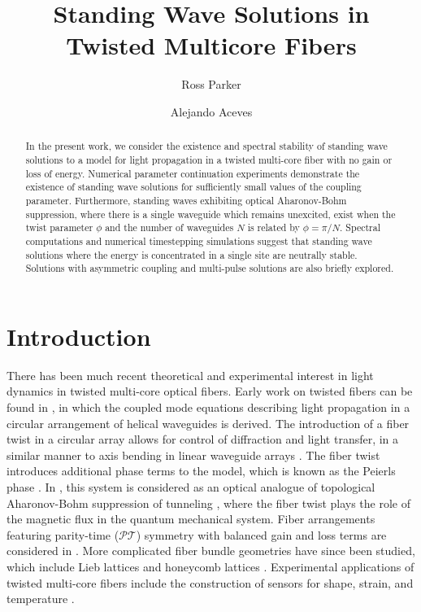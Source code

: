 \documentclass[reprint, amsmath,amssymb,aps,pra]{revtex4-2}
\begin{document}
\title{Standing Wave Solutions in Twisted Multicore Fibers}

\author{Ross Parker}
\address{Department of Mathematics, Southern Methodist Univeristy, 
Dallas, TX 75275}

\author{Alejando Aceves}
\address{Department of Mathematics, Southern Methodist Univeristy, 
Dallas, TX 75275}

\begin{abstract}
In the present work, we consider the existence and spectral stability of standing wave solutions to a model for light propagation in a twisted multi-core fiber with no gain or loss of energy. Numerical parameter continuation experiments demonstrate the existence of standing wave solutions for sufficiently small values of the coupling parameter. Furthermore, standing waves exhibiting optical Aharonov-Bohm suppression, where there is a single waveguide which remains unexcited, exist when the twist parameter $\phi$ and the number of waveguides $N$ is related by $\phi = \pi/N$. Spectral computations and numerical timestepping simulations suggest that standing wave solutions where the energy is concentrated in a single site are neutrally stable. Solutions with asymmetric coupling and multi-pulse solutions are also briefly explored. 
\end{abstract}

\maketitle

\section{Introduction}

There has been much recent theoretical and experimental interest in light dynamics in twisted multi-core optical fibers. Early work on twisted fibers can be found in \cite{Longhi2007,Longhi2007b}, in which the coupled mode equations describing light propagation in a circular arrangement of helical waveguides is derived. The introduction of a fiber twist in a circular array allows for control of diffraction and light transfer, in a similar manner to axis bending in linear waveguide arrays \cite{Longhi2005}. The fiber twist introduces additional phase terms to the model, which is known as the Peierls phase \cite{Longhi2007,Peierls1933}. In \cite{Ornigotti2007}, this system is considered as an optical analogue of topological Aharonov-Bohm suppression of tunneling \cite{Loss1992}, where the fiber twist plays the role of the magnetic flux in the quantum mechanical system. Fiber arrangements featuring parity-time ($\mathcal{PT}$) symmetry with balanced gain and loss terms are considered in \cite{Longhi2016,castro2016}. More complicated fiber bundle geometries have since been studied, which include Lieb lattices \cite{Marzuola2019bulk} and honeycomb lattices \cite{Ablowitz2014,Lumer2013}. Experimental applications of twisted multi-core fibers include the construction of sensors for shape, strain, and temperature \cite{Gannot2014,Westbrook2017}. 
\end{document}
